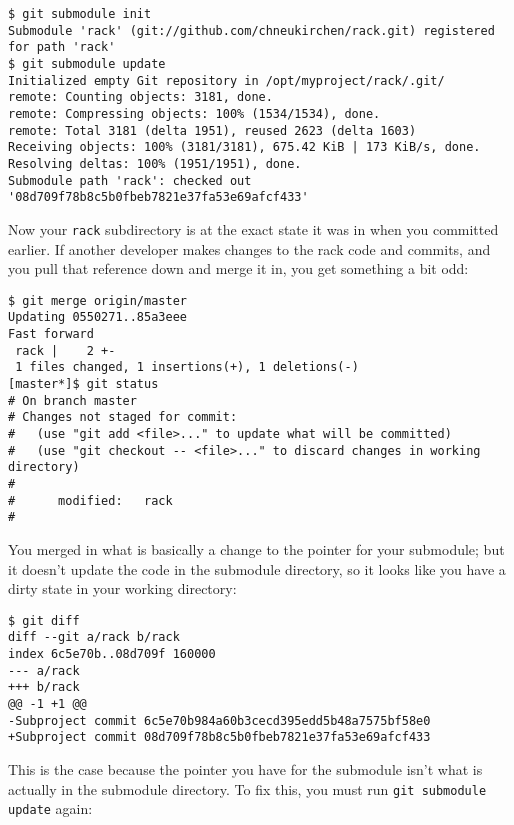 \documentclass[a4paper]{book}
\begin{document}
\begin{shaded}\begin{verbatim}
$ git submodule init
Submodule 'rack' (git://github.com/chneukirchen/rack.git) registered for path 'rack'
$ git submodule update
Initialized empty Git repository in /opt/myproject/rack/.git/
remote: Counting objects: 3181, done.
remote: Compressing objects: 100% (1534/1534), done.
remote: Total 3181 (delta 1951), reused 2623 (delta 1603)
Receiving objects: 100% (3181/3181), 675.42 KiB | 173 KiB/s, done.
Resolving deltas: 100% (1951/1951), done.
Submodule path 'rack': checked out '08d709f78b8c5b0fbeb7821e37fa53e69afcf433'
\end{verbatim}\end{shaded}

Now your \texttt{rack} subdirectory is at the exact state it was in when you committed earlier. If another developer makes changes to the rack code and commits, and you pull that reference down and merge it in, you get something a bit odd:

\begin{shaded}\begin{verbatim}
$ git merge origin/master
Updating 0550271..85a3eee
Fast forward
 rack |    2 +-
 1 files changed, 1 insertions(+), 1 deletions(-)
[master*]$ git status
# On branch master
# Changes not staged for commit:
#   (use "git add <file>..." to update what will be committed)
#   (use "git checkout -- <file>..." to discard changes in working directory)
#
#      modified:   rack
#
\end{verbatim}\end{shaded}

You merged in what is basically a change to the pointer for your submodule; but it doesn't update the code in the submodule directory, so it looks like you have a dirty state in your working directory:

\begin{shaded}\begin{verbatim}
$ git diff
diff --git a/rack b/rack
index 6c5e70b..08d709f 160000
--- a/rack
+++ b/rack
@@ -1 +1 @@
-Subproject commit 6c5e70b984a60b3cecd395edd5b48a7575bf58e0
+Subproject commit 08d709f78b8c5b0fbeb7821e37fa53e69afcf433
\end{verbatim}\end{shaded}

This is the case because the pointer you have for the submodule isn't what is actually in the submodule directory. To fix this, you must run \texttt{git submodule update} again:
\end{document}
